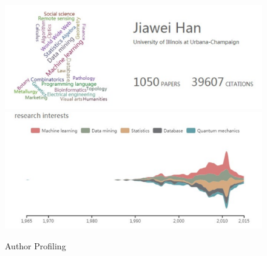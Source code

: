 \begin{figure}
\centering
\includegraphics[width=\columnwidth]{hjwAvatar.pdf}
\includegraphics[width=\columnwidth]{hjwInterest.pdf}
\caption{Author Profiling}
\label{fig:hjwProfile}
\vspace{-3ex}
\end{figure}



